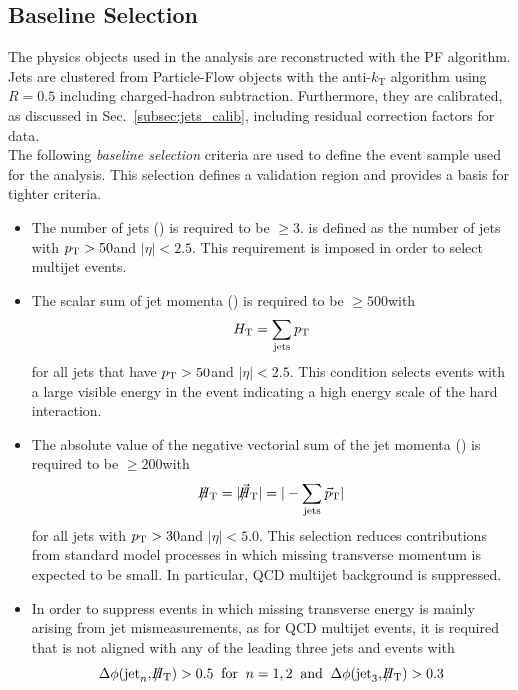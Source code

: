 \subsection{Baseline Selection}
\label{subsec:RA2_baseline}
The physics objects used in the analysis are reconstructed with the PF algorithm. Jets are clustered from Particle-Flow objects with the anti-$k_\mathrm{T}$ algorithm using $R = 0.5$ including charged-hadron subtraction. Furthermore, they are calibrated, as discussed in Sec.~\ref{subsec:jets_calib}, including residual correction factors for data. \\
The following \textit{baseline selection} criteria are used to define the event sample used for the analysis. This selection defines a validation region and provides a basis for tighter criteria.
\begin{itemize}
 \item{The number of jets (\NJets) is required to be $\ge 3$. \NJets is defined as the number of jets with $p_{\text{T}} > 50$\gev and $|\eta| < 2.5$. This requirement is imposed in order to select multijet events.}
 \item{The scalar sum of jet momenta (\HT) is required to be $\ge 500$\gev with 
\begin{equation*}
H_{\text{T}} = \sum_{\mathrm{jets}} p_{\text{T}} 
\end{equation*}
for all jets that have $p_{\text{T}} > 50$\gev and $|\eta| < 2.5$. This condition selects events with a large visible energy in the event indicating a high energy scale of the hard interaction.}   
 \item{The absolute value of the negative vectorial sum of the jet momenta (\MHT) is required to be $\ge 200$\gev with
\begin{equation*}
\slash\mkern-12mu{H}_{\text{T}} = |\slash\mkern-12mu{\vec{H}}_{\text{T}}|= |- \sum_{\mathrm{jets}} \vec{p}_{\text{T}} |
\end{equation*}
for all jets with $p_{\text{T}} > 30$\gev and $|\eta| < 5.0$. This selection reduces contributions from standard model processes in which missing transverse momentum is expected to be small. In particular, QCD multijet background is suppressed. } 
 \item{In order to suppress events in which missing transverse energy is mainly arising from jet mismeasurements, as for QCD multijet events, it is required that \MHT is not aligned with any of the leading three jets and events with
\begin{equation*}
\Delta \phi(\mathrm{jet}_n, \slash\mkern-12mu{H}_{\text{T}}) > 0.5 \;\; \mathrm{for} \;\; n = 1,2 \;\; \mathrm{and} \;\; \Delta \phi(\mathrm{jet}_3, \slash\mkern-12mu{H}_{\text{T}}) > 0.3
\end{equation*} 
}
\end{itemize}
